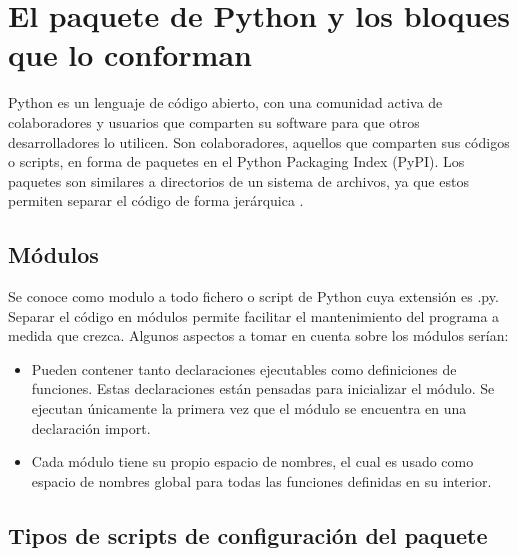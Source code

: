 \section{El paquete de Python y los bloques que lo conforman}
Python es un lenguaje de código abierto, con una comunidad activa de colaboradores y usuarios que comparten su software para que otros desarrolladores lo utilicen. Son colaboradores, aquellos que comparten sus códigos o scripts, en forma de paquetes en el Python Packaging Index (PyPI). Los paquetes son similares a directorios de un sistema de archivos, ya que estos permiten separar el código de forma jerárquica \cite{Paquetes}. 
\subsection{Módulos}
Se conoce como modulo a todo fichero o script de Python cuya extensión es .py. Separar el código en módulos permite facilitar el mantenimiento del programa a medida que crezca. Algunos aspectos a tomar en cuenta sobre los módulos serían:
\begin{itemize}
    \item Pueden contener tanto declaraciones ejecutables como definiciones de funciones. Estas declaraciones están pensadas para inicializar el módulo. Se ejecutan únicamente la primera vez que el módulo se encuentra en una declaración import\cite{ModuloPython}.
    \item Cada módulo tiene su propio espacio de nombres, el cual es usado como espacio de nombres global para todas las funciones definidas en su interior.
\end{itemize}
\subsection{Tipos de scripts de configuración del paquete}

